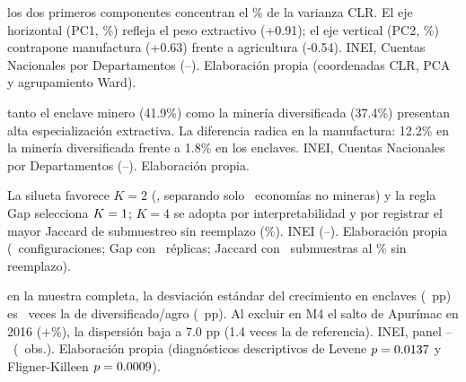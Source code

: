 \documentclass[aspectratio=169,11pt]{beamer}
\begin{document}
{ los dos primeros componentes concentran el \PcaCumulative\% de la varianza CLR. El eje horizontal (PC1, \PcaOne\%) refleja el peso extractivo (+0.91); el eje vertical (PC2, \PcaTwo\%) contrapone manufactura (+0.63) frente a agricultura (-0.54).}
{INEI, Cuentas Nacionales por Departamentos (\PreStart--\PreEnd). Elaboración propia (coordenadas CLR, PCA y agrupamiento Ward).}

{ tanto el enclave minero (41.9\%) como la minería diversificada (37.4\%) presentan alta especialización extractiva. La diferencia radica en la manufactura: 12.2\% en la minería diversificada frente a 1.8\% en los enclaves.}
{INEI, Cuentas Nacionales por Departamentos (\PreStart--\PreEnd). Elaboración propia.}

{ La silueta favorece $K=2$ (\SilMacro, separando solo \WardSmallCount\ economías no mineras) y la regla Gap selecciona $K=1$; $K=4$ se adopta por interpretabilidad y por registrar el mayor Jaccard de submuestreo sin reemplazo (\JaccardWard\%).}
{INEI (\PreStart--\PreEnd). Elaboración propia (\SpecCount\ configuraciones; Gap con \GapReplicas\ réplicas; Jaccard con \StabilityReplicas\ submuestras al \SubsamplePct\% sin reemplazo).}

{ en la muestra completa, la desviación estándar del crecimiento en enclaves (\SdEnclave\ pp) es \SdRatio\ veces la de diversificado/agro (\SdAgro\ pp). Al excluir en M4 el salto de Apurímac en 2016 (+\ExtremeGrowth\%), la dispersión baja a 7.0 pp (1.4 veces la de referencia).}
{INEI, panel \RateStart--\RateEnd\ (\RatesObs\ obs.). Elaboración propia (diagnósticos descriptivos de Levene $p=0.0137$ y Fligner-Killeen $p=0.0009$).}
\end{document}
